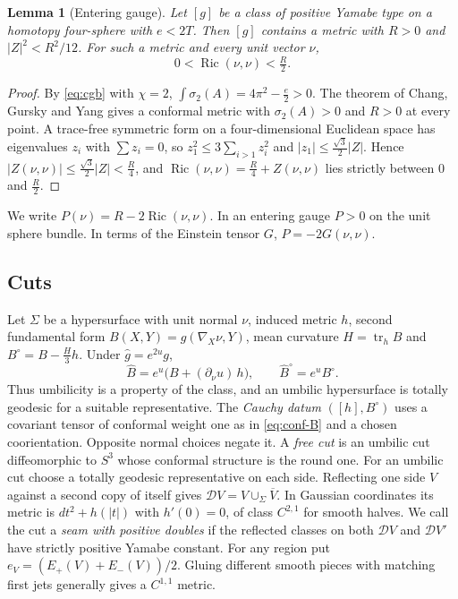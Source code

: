 \documentclass[11pt,letterpaper]{article}
\numberwithin{equation}{section}
\newtheorem{lemma}[theorem]{Lemma}
\theoremstyle{definition}
\DeclareMathOperator{\Ric}{Ric}
\DeclareMathOperator{\tr}{tr}
\newcommand{\cD}{\mathcal D}
\begin{document}
\begin{lemma}[Entering gauge]\label{lem:gauge}
Let \([g]\) be a class of positive Yamabe type on a homotopy four-sphere
with \(e<2T\). Then \([g]\) contains a metric with \(R>0\) and
\(|Z|^2<R^2/12\). For such a metric and every unit vector \(\nu\),
\[
 0<\Ric(\nu,\nu)<\tfrac R2 .
\]
\end{lemma}
\begin{proof}
By \eqref{eq:cgb} with \(\chi=2\), \(\int\sigma_2(A)=4\pi^2-\tfrac e2>0\).
The theorem of Chang, Gursky and Yang
\cite{ChangGurskyYang2002PositiveRicci} gives a conformal metric with
\(\sigma_2(A)>0\) and \(R>0\) at every point. A trace-free symmetric form
on a four-dimensional Euclidean space has eigenvalues \(z_i\) with
\(\sum z_i=0\), so \(z_1^2\le3\sum_{i>1}z_i^2\) and
\(|z_1|\le\tfrac{\sqrt3}{2}|Z|\). Hence
\(|Z(\nu,\nu)|\le\tfrac{\sqrt3}{2}|Z|<\tfrac R4\), and
\(\Ric(\nu,\nu)=\tfrac R4+Z(\nu,\nu)\) lies strictly between \(0\) and
\(\tfrac R2\).
\end{proof}

We write \(P(\nu)=R-2\Ric(\nu,\nu)\). In an entering gauge \(P>0\) on the
unit sphere bundle. In terms of the Einstein tensor \(G\), \(P=-2G(\nu,\nu)\).

\subsection{Cuts}
Let \(\Sigma\) be a hypersurface with unit normal \(\nu\), induced metric
\(h\), second fundamental form \(B(X,Y)=g(\nabla_X\nu,Y)\), mean curvature
\(H=\tr_hB\) and \(B^\circ=B-\tfrac H3h\). Under \(\hat g=e^{2u}g\),
\begin{equation}\label{eq:conf-B}
 \hat B=e^{u}\bigl(B+(\partial_\nu u)\,h\bigr),\qquad
 \hat B^\circ=e^{u}B^\circ .
\end{equation}
Thus umbilicity is a property of the class, and an umbilic hypersurface is
totally geodesic for a suitable representative. The \emph{Cauchy datum} \(([h],B^\circ)\) uses a covariant
tensor of conformal weight one as in \eqref{eq:conf-B} and a chosen
coorientation. Opposite normal choices negate it. A \emph{free cut}
is an umbilic cut diffeomorphic to \(S^3\) whose conformal structure is
the round one. For an umbilic cut choose a totally geodesic representative on each
side. Reflecting one side \(V\) against a second copy of itself gives
\(\cD V=V\cup_\Sigma\overline V\). In Gaussian coordinates its metric
is \(dt^2+h(|t|)\) with \(h'(0)=0\), of class \(C^{2,1}\) for smooth halves.
We call the cut a \emph{seam with positive doubles} if the reflected
classes on both \(\cD V\) and \(\cD V'\) have strictly positive Yamabe
constant. For any region put \(e_V=(E_+(V)+E_-(V))/2\).
Gluing different smooth pieces with matching first jets generally gives
a \(C^{1,1}\) metric.
\end{document}
